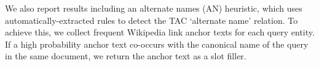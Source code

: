 We also report results including an alternate names (AN) heuristic, which uses automatically-extracted rules to detect the TAC `alternate name' relation.
To achieve this, we collect frequent Wikipedia link anchor texts for each query entity.
If a high probability anchor text co-occurs with the canonical name of the query in the same document, we return the anchor text as a slot filler.


